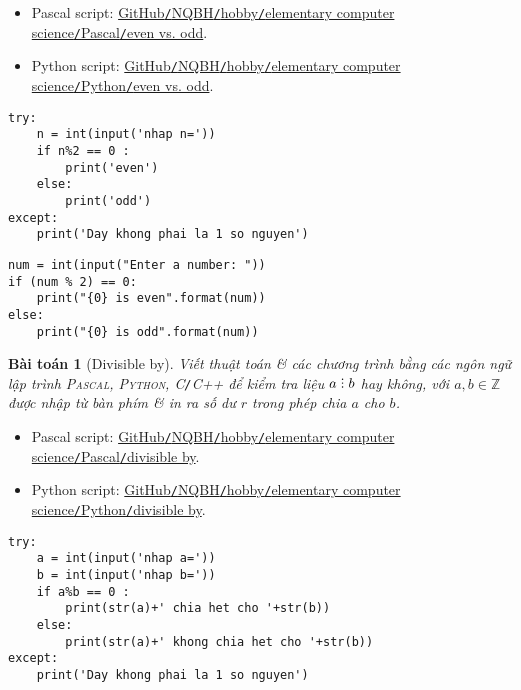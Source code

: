 \documentclass{article}
\newtheorem{baitoan}{Bài toán}
\DeclareRobustCommand{\divby}{%
	\mathrel{\vbox{\baselineskip.65ex\lineskiplimit0pt\hbox{.}\hbox{.}\hbox{.}}}%
}
\begin{document}
\begin{itemize}
	\item Pascal script: \href{https://github.com/NQBH/hobby/blob/master/elementary_computer_science/Pascal/even_odd.pas}{GitHub\texttt{/}NQBH\texttt{/}hobby\texttt{/}elementary computer science\texttt{/}Pascal\texttt{/}even vs. odd}.
	\item Python script: \href{https://github.com/NQBH/hobby/blob/master/elementary_computer_science/Python/even_odd.py}{GitHub\texttt{/}NQBH\texttt{/}hobby\texttt{/}elementary computer science\texttt{/}Python\texttt{/}even vs. odd}.
\end{itemize}

\begin{multicols}{2}
    \begin{verbatim}
try:
    n = int(input('nhap n='))
    if n%2 == 0 :
        print('even')
    else:
        print('odd')
except:
    print('Day khong phai la 1 so nguyen')
    \end{verbatim}
    \columnbreak
    \begin{verbatim}
num = int(input("Enter a number: "))
if (num % 2) == 0:
    print("{0} is even".format(num))
else:
    print("{0} is odd".format(num))
    \end{verbatim}
\end{multicols}

\begin{baitoan}[Divisible by]
	Viết thuật toán \& các chương trình bằng các ngôn ngữ lập trình \textsc{Pascal, Python, C\texttt{/}C++} để kiểm tra liệu $a\divby b$ hay không, với $a,b\in\mathbb{Z}$ được nhập từ bàn phím \& in ra số dư $r$ trong phép chia $a$ cho $b$.
\end{baitoan}

\begin{itemize}
	\item Pascal script: \href{https://github.com/NQBH/hobby/blob/master/elementary_computer_science/Pascal/divisible_by.pas}{GitHub\texttt{/}NQBH\texttt{/}hobby\texttt{/}elementary computer science\texttt{/}Pascal\texttt{/}divisible by}.
	\item Python script: \href{https://github.com/NQBH/hobby/blob/master/elementary_computer_science/Python/divisible_by.py}{GitHub\texttt{/}NQBH\texttt{/}hobby\texttt{/}elementary computer science\texttt{/}Python\texttt{/}divisible by}.
\end{itemize}

\begin{verbatim}
try:
    a = int(input('nhap a='))
    b = int(input('nhap b='))
    if a%b == 0 :
        print(str(a)+' chia het cho	'+str(b))
    else:
        print(str(a)+' khong chia het cho '+str(b))
except:
    print('Day khong phai la 1 so nguyen')
\end{verbatim}
\end{document}
